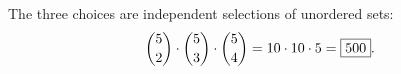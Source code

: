 The three choices are independent selections of unordered sets:
\[
\dbinom52\cdot\dbinom53\cdot\dbinom54=10\cdot10\cdot5=\boxed{500}.
\]
